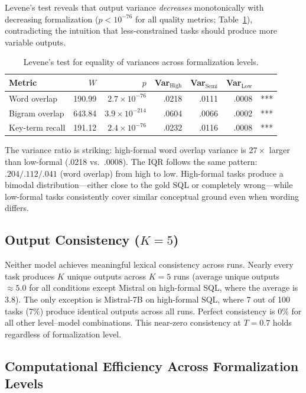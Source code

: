 \documentclass[runningheads]{llncs}
\begin{document}
Levene's test reveals that output variance \emph{decreases} monotonically with decreasing formalization ($p < 10^{-76}$ for all quality metrics; Table~\ref{tab:levene}), contradicting the intuition that less-constrained tasks should produce more variable outputs.

\begin{table}[h]
\centering
\caption{Levene's test for equality of variances across formalization levels.}
\label{tab:levene}
\begin{tabular}{lrrrrrl}
\toprule
Metric & $W$ & $p$ & Var$_{\text{High}}$ & Var$_{\text{Semi}}$ & Var$_{\text{Low}}$ & \\
\midrule
Word overlap    & 190.99 & $2.7 \times 10^{-76}$  & .0218 & .0111 & .0008 & *** \\
Bigram overlap  & 643.84 & $3.9 \times 10^{-214}$ & .0604 & .0066 & .0002 & *** \\
Key-term recall & 191.12 & $2.4 \times 10^{-76}$   & .0232 & .0116 & .0008 & *** \\
\bottomrule
\end{tabular}
\end{table}

The variance ratio is striking: high-formal word overlap variance is $27\times$ larger than low-formal (.0218 vs.\ .0008). The IQR follows the same pattern: $.204/.112/.041$ (word overlap) from high to low. High-formal tasks produce a bimodal distribution---either close to the gold SQL or completely wrong---while low-formal tasks consistently cover similar conceptual ground even when wording differs.

\subsection{Output Consistency ($K\!=\!5$)}
\label{sec:consistency}

Neither model achieves meaningful lexical consistency across runs. Nearly every task produces $K$ unique outputs across $K\!=\!5$ runs (average unique outputs $\approx 5.0$ for all conditions except Mistral on high-formal SQL, where the average is 3.8). The only exception is Mistral-7B on high-formal SQL, where 7 out of 100 tasks (7\%) produce identical outputs across all runs. Perfect consistency is 0\% for all other level--model combinations. This near-zero consistency at $T\!=\!0.7$ holds regardless of formalization level.

\subsection{Computational Efficiency Across Formalization Levels}
\label{sec:efficiency}
\end{document}
